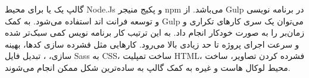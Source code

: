  گالپ یک 
  یا 
   برای محیط Node.Js و پکیج منیجر npm می‌باشد. از Gulp در برنامه نویسی و توسعه فرانت اند استفاده می‌شود. به کمک Gulp می‌توان یک سری کارهای تکراری و زمان‌بر را به صورت خودکار انجام داد. به این ترتیب کار برنامه نویس کمی سبک‌تر شده و سرعت اجرای پروژه تا حد زیادی بالا می‌رود.
کارهایی مثل فشرده سازی کدها، بهینه سازی، 
، تبدیل فایل Sass به CSS، ساخت تمپلیت HTML، فشرده کردن تصاویر، ساخت محیط لوکال هاست و غیره به کمک گالپ به ساده‌ترین شکل ممکن انجام می‌شوند.